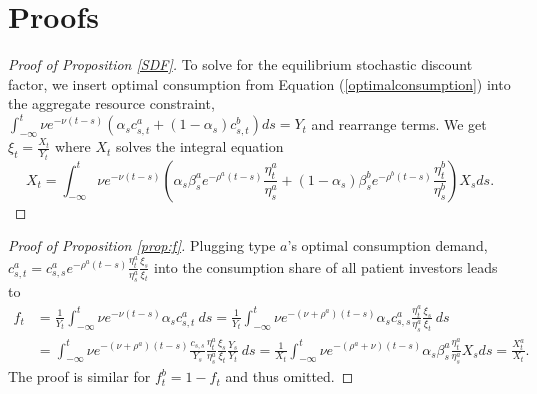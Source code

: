 \documentclass[preprint,11pt,authoryear]{elsarticle}
\theoremstyle{plain}
\begin{document}
\section{Proofs}\label{sec:Appendix}
% 
\begin{proof}[Proof of Proposition \ref{SDF}]
To solve for the  equilibrium stochastic discount factor, we insert optimal consumption from Equation (\ref{optimalconsumption}) into the aggregate resource constraint, $\int_{-\infty}^{t} \nu e^{-\nu (t-s )} (\alpha_s c^a_{s,t}+(1-\alpha_s) c^b_{s,t}) ds =  Y_t$ and rearrange terms. We get $\xi_t = \frac{X_t}{Y_t}$ where $X_t$ solves the integral equation 
%
\begin{equation}\label{eq:Xtapp}
	X_t =\int_{-\infty}^{t} \nu e^{-\nu \left(t-s\right)} \left(\alpha_s \beta^a_s e^{-\rho^a \left(t-s\right)}\frac{\eta^a_t}{\eta^a_s} +\left(1-\alpha_s\right)\beta^b_s e^{-\rho^b \left(t-s\right)} \frac{\eta^b_t}{\eta^b_s}\right)X_s ds.
\end{equation}
%
\end{proof}
%
%
\begin{proof}[Proof of Proposition \ref{prop:f}]
Plugging type $a$'s optimal consumption demand, $c^a_{s,t} = c_{s,s}^ae^{-\rho^a (t-s)} \frac{\eta^a_t}{\eta^a_s} \frac{\xi_s}{\xi_t}$ into the consumption share of all patient investors leads to
%
\begin{equation}
 \begin{split}
    f_t &= \frac{1}{Y_t} \int_{-\infty}^{t} \nu e^{-\nu (t-s)} \alpha_s  c^a_{s,t} \: ds = 
    \frac{1}{Y_t} \int_{-\infty}^{t} \nu e^{-\left(\nu+\rho^a\right)  (t-s)}\alpha_s  c^a_{s,s} \frac{\eta^a_t}{\eta^a_s} \frac{\xi_s}{\xi_t} \: ds \\
    &= \int_{-\infty}^{t} \nu e^{-\left(\nu+\rho^a\right)  (t-s)} \frac{c_{s,s}}{Y_s} \frac{\eta^a_t}{\eta^a_s} \frac{\xi_s}{\xi_t} \frac{Y_s}{Y_t}  \: ds =
    \frac{1}{X_t}\int_{-\infty}^{t} \nu e^{-\left(\rho^a + \nu\right)\left(t-s\right)}\alpha_s \beta^a_s \frac{\eta^a_t}{\eta^a_s} X_s ds   = \frac{X_t^a}{X_t}.
 \end{split}   
\end{equation}
The proof is similar for $f_t^b=1-f_t$ and thus omitted. 
\end{proof}
\end{document}
